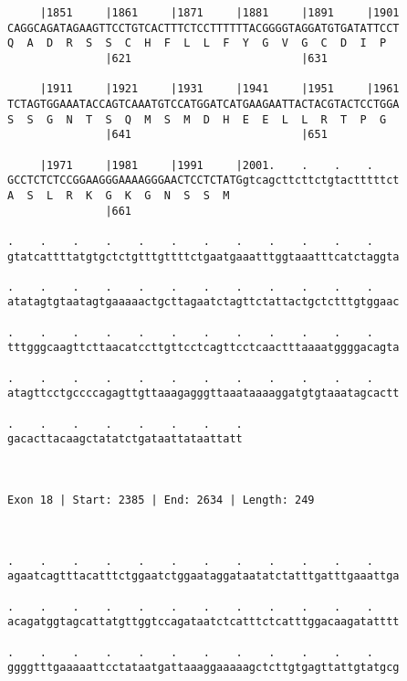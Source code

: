 \documentclass{article}
\begin{document}
\begin{Verbatim}
     |1851     |1861     |1871     |1881     |1891     |1901
CAGGCAGATAGAAGTTCCTGTCACTTTCTCCTTTTTTACGGGGTAGGATGTGATATTCCT
Q  A  D  R  S  S  C  H  F  L  L  F  Y  G  V  G  C  D  I  P  
               |621                          |631           
  
     |1911     |1921     |1931     |1941     |1951     |1961
TCTAGTGGAAATACCAGTCAAATGTCCATGGATCATGAAGAATTACTACGTACTCCTGGA
S  S  G  N  T  S  Q  M  S  M  D  H  E  E  L  L  R  T  P  G  
               |641                          |651           
  
     |1971     |1981     |1991     |2001.    .    .    .    
GCCTCTCTCCGGAAGGGAAAAGGGAACTCCTCTATGgtcagcttcttctgtactttttct
A  S  L  R  K  G  K  G  N  S  S  M                          
               |661                                         
  
.    .    .    .    .    .    .    .    .    .    .    .    
gtatcattttatgtgctctgtttgttttctgaatgaaatttggtaaatttcatctaggta
                                                            
.    .    .    .    .    .    .    .    .    .    .    .    
atatagtgtaatagtgaaaaactgcttagaatctagttctattactgctctttgtggaac
                                                            
.    .    .    .    .    .    .    .    .    .    .    .    
tttgggcaagttcttaacatccttgttcctcagttcctcaactttaaaatggggacagta
                                                            
.    .    .    .    .    .    .    .    .    .    .    .    
atagttcctgccccagagttgttaaagagggttaaataaaaggatgtgtaaatagcactt
                                                            
.    .    .    .    .    .    .    .
gacacttacaagctatatctgataattataattatt
                                    
                                    
 
Exon 18 | Start: 2385 | End: 2634 | Length: 249



.    .    .    .    .    .    .    .    .    .    .    .    
agaatcagtttacatttctggaatctggaataggataatatctatttgatttgaaattga
                                                            
.    .    .    .    .    .    .    .    .    .    .    .    
acagatggtagcattatgttggtccagataatctcatttctcatttggacaagatatttt
                                                            
.    .    .    .    .    .    .    .    .    .    .    .    
ggggtttgaaaaattcctataatgattaaaggaaaaagctcttgtgagttattgtatgcg
                                                            

\end{Verbatim}
\end{document}
